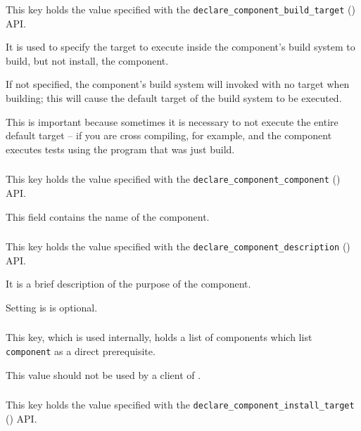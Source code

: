 This key holds the value specified with the
\texttt{declare\_component\_build\_target}
() API.

It is used to specify the target to execute inside the component's
build system to build, but not install, the component.

If not specified, the component's build system will invoked with no
target when building; this will cause the default target of the build
system to be executed.

This is important because sometimes it is necessary to not execute the
entire default target -- if you are cross compiling, for example, and
the component executes tests using the program that was just build.

\subsubsection{}

This key holds the value specified with the
\texttt{declare\_component\_component} () API.

This field contains the name of the component.

\subsubsection{}

This key holds the value specified with the
\texttt{declare\_component\_description}
() API.

It is a brief description of the purpose of the component.

Setting is is optional.

\subsubsection{}

This key, which is used internally, holds a list of components which
list \texttt{component} as a direct prerequisite.

This value should not be used by a client of \lmsbw.

\subsubsection{}
This key holds the value specified with the
\texttt{declare\_component\_install\_target}
() API.

